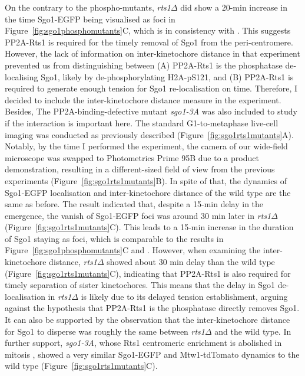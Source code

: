 On the contrary to the phospho-mutants, \textit{rts1$\Delta$} did show a 20-\si{\minute} increase in the time Sgo1-EGFP being visualised as foci in Figure~\ref{fig:sgo1phosphomutants}C, which is in consistency with \cite{Nerusheva2014}. This suggests PP2A-Rts1 is required for the timely removal of Sgo1 from the peri-centromere. However, the lack of information on inter-kinetochore distance in that experiment prevented us from distinguishing between (A) PP2A-Rts1 is the phosphatase de-localising Sgo1, likely by de-phosphorylating H2A-pS121, and (B) PP2A-Rts1 is required to generate enough tension for Sgo1 re-localisation on time. Therefore, I decided to include the inter-kinetochore distance measure in the experiment. Besides, The PP2A-binding-defective mutant \textit{sgo1-3A} was also included to study if the interaction is important here. The standard G1-to-metaphase live-cell imaging was conducted as previously described (Figure~\ref{fig:sgo1rts1mutants}A). Notably, by the time I performed the experiment, the camera of our wide-field microscope was swapped to Photometrics Prime 95B due to a product demonstration, resulting in a different-sized field of view from the previous experiments (Figure~\ref{fig:sgo1rts1mutants}B). In spite of that, the dynamics of Sgo1-EGFP localisation and inter-kinetochore distance of the wild type are the same as before. The result indicated that, despite a 15-\si{\minute} delay in the emergence, the vanish of Sgo1-EGFP foci was around 30 \si{\minute} later in \textit{rts1$\Delta$} (Figure~\ref{fig:sgo1rts1mutants}C). This leads to a 15-\si{\minute} increase in the duration of Sgo1 staying as foci, which is comparable to the results in Figure~\ref{fig:sgo1phosphomutants}C and \cite{Nerusheva2014}. However, when examining the inter-kinetochore distance, \textit{rts1$\Delta$} showed about 30 \si{\minute} delay than the wild type (Figure~\ref{fig:sgo1rts1mutants}C), indicating that PP2A-Rts1 is also required for timely separation of sister kinetochores. This means that the delay in Sgo1 de-localisation in \textit{rts1$\Delta$} is likely due to its delayed tension establishment, arguing against the hypothesis that PP2A-Rts1 is the phosphatase directly removes Sgo1. It can also be supported by the observation that the inter-kinetochore distance for Sgo1 to disperse was roughly the same between \textit{rts1$\Delta$} and the wild type. In further support, \textit{sgo1-3A}, whose Rts1 centromeric enrichment is abolished in mitosis \citep{Eshleman2014}, showed a very similar Sgo1-EGFP and Mtw1-tdTomato dynamics to the wild type (Figure~\ref{fig:sgo1rts1mutants}C). 

